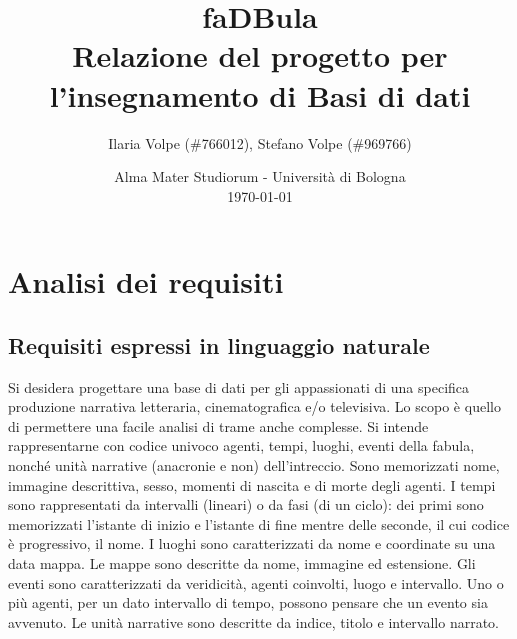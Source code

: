 \documentclass{article}
\title{
  faDBula \\
  \textbf{\large
      Relazione del progetto per l'insegnamento di \break
      Basi di dati
  }
}
\author{
  Ilaria Volpe (\#766012),
  Stefano Volpe (\#969766)
}
\date{
	Alma Mater Studiorum - Universit\`a di Bologna \\
  \today
}
\begin{document}
\maketitle

\section{Analisi dei requisiti}

\subsection{Requisiti espressi in linguaggio naturale}

Si desidera progettare una base di dati per gli appassionati di una specifica
produzione narrativa letteraria, cinematografica e/o televisiva. Lo scopo è
quello di permettere una facile analisi di trame anche complesse. Si intende
rappresentarne con codice univoco agenti, tempi, luoghi, eventi della fabula,
nonché unità narrative (anacronie e non) dell'intreccio. Sono memorizzati nome,
immagine descrittiva, sesso, momenti di nascita e di morte degli agenti. I
tempi sono rappresentati da intervalli (lineari) o da fasi (di un ciclo): dei
primi sono memorizzati l'istante di inizio e l'istante di fine mentre delle
seconde, il cui codice è progressivo, il nome. I luoghi sono caratterizzati da
nome e coordinate su una data mappa. Le mappe sono descritte da nome, immagine
ed estensione. Gli eventi sono caratterizzati da veridicità, agenti coinvolti,
luogo e intervallo. Uno o più agenti, per un dato intervallo di tempo, possono
pensare che un evento sia avvenuto. Le unità narrative sono descritte da indice,
titolo e intervallo narrato.
\end{document}
